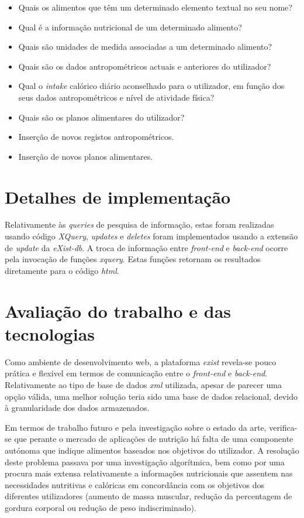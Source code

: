 \documentclass[twocolumn,twoside,11pt,a4paper]{article}
\begin{document}
\begin{itemize}
	\item Quais os alimentos que têm um determinado elemento textual no seu nome?
  \item Qual é a informação nutricional de um determinado alimento?
  \item Quais são unidades de medida associadas a um determinado alimento?
  \item Quais são os dados antropométricos actuais e anteriores do utilizador?
    \item Qual o \textit{intake} calórico diário aconselhado para o utilizador, em função dos seus dados antropométricos e nível de atividade física?
  \item Quais são os planos alimentares do utilizador?
  \item Inserção de novos registos antropométricos.
  \item Inserção de novos planos alimentares.
\end{itemize}


\section{Detalhes de implementação}
Relativamente às \textit{queries} de pesquisa de informação, estas foram realizadas usando código \textit{XQuery}, \textit{updates} e \textit{deletes} foram implementados usando a extensão de \textit{update} \cite{update_ext} da \textit{eXist-db}. A troca de informação entre \textit{front-end} e \textit{back-end} ocorre pela invocação de funções \textit{xquery}. Estas funções retornam os resultados diretamente para o código \textit{html}.




\section{Avaliação do trabalho e das tecnologias}\label{sec:conclusions}

Como ambiente de desenvolvimento web, a plataforma \textit{exist} revela-se pouco prática e flexivel em termos de comunicação entre o \textit{front-end} e \textit{back-end}. Relativamente ao tipo de base de dados \textit{xml} utilizada, apesar de parecer uma opção válida, uma melhor solução teria sido uma base de dados relacional, devido à granularidade dos dados armazenados.

Em termos de trabalho futuro e pela investigação sobre o estado da arte, verifica-se que perante o mercado de aplicações de nutrição há falta de uma componente autónoma que indique alimentos baseados nos objetivos do utilizador. A resolução deste problema passava por uma investigação algorítmica, bem como por uma procura mais extensa relativamente a informações nutricionais que assentem nas necessidades nutritivas e calóricas em concordância com os objetivos dos diferentes utilizadores (aumento de massa muscular, redução da percentagem de gordura corporal ou redução de peso indiscriminado).
\end{document}
